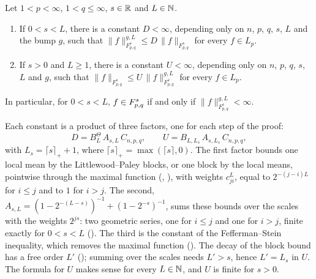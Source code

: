 \begin{theorem}
\label{thm:tl-local-means}
\leanok
{}
Let $1 < p < \infty$, $1 < q \leq \infty$, $s \in \mathbb{R}$ and $L \in \mathbb{N}$.
\begin{enumerate}
  \item If $0 < s < L$, there is a constant $D < \infty$, depending only on $n$, $p$, $q$, $s$,
    $L$ and the bump $g$, such that $\|f\|^{g,L}_{F^s_{p,q}} \leq D \, \|f\|_{F^s_{p,q}}$ for
    every $f \in L_p$.
  \item If $s > 0$ and $L \geq 1$, there is a constant $U < \infty$, depending only on $n$, $p$,
    $q$, $s$, $L$ and $g$, such that $\|f\|_{F^s_{p,q}} \leq U \, \|f\|^{g,L}_{F^s_{p,q}}$ for
    every $f \in L_p$.
\end{enumerate}
In particular, for $0 < s < L$, $f \in F^{s}_{p,q}$ if and only if
$\|f\|^{g,L}_{F^s_{p,q}} < \infty$.
\end{theorem}

Each constant is a product of three factors, one for each step of the proof:
\[
  D = B^\Theta_L \, A_{s,L} \, C_{n,p,q}, \qquad U = B_{L,L_s} \, A_{s,L_s} \, C_{n,p,q},
\]
with $L_s = \lceil s \rceil_+ + 1$, where $\lceil s \rceil_+ = \max(\lceil s \rceil, 0)$. The
first factor bounds one local mean by the Littlewood--Paley blocks, or one block by the local
means, pointwise through the maximal function (,
), with weights $c^L_{ji}$, equal to $2^{-(j-i)L}$ for $i \leq j$
and to $1$ for $i > j$. The second, $A_{s,L} = (1 - 2^{-(L-s)})^{-1} + (1 - 2^{-s})^{-1}$, sums
these bounds over the scales with the weights $2^{js}$: two geometric series, one for $i \leq j$
and one for $i > j$, finite exactly for $0 < s < L$ (). The third is
the constant of the Fefferman--Stein inequality, which removes the maximal function
(). The decay of the block bound has a free order $L'$
(); summing over the scales needs $L' > s$, hence $L' = L_s$ in $U$.
The formula for $U$ makes sense for every $L \in \mathbb{N}$, and $U$ is finite for $s > 0$.

